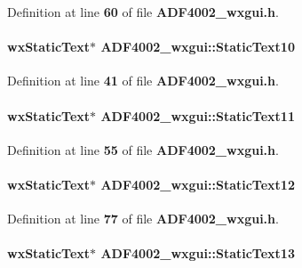 Definition at line {\bf 60} of file {\bf A\+D\+F4002\+\_\+wxgui.\+h}.

\paragraph[{Static\+Text10}]{\setlength{\rightskip}{0pt plus 5cm}wx\+Static\+Text$\ast$ A\+D\+F4002\+\_\+wxgui\+::\+Static\+Text10}\label{classADF4002__wxgui_a348617f7dad87cd244105639b76d079e}


Definition at line {\bf 41} of file {\bf A\+D\+F4002\+\_\+wxgui.\+h}.

\paragraph[{Static\+Text11}]{\setlength{\rightskip}{0pt plus 5cm}wx\+Static\+Text$\ast$ A\+D\+F4002\+\_\+wxgui\+::\+Static\+Text11}\label{classADF4002__wxgui_a2027fef7ab532631216e2fc985789f92}


Definition at line {\bf 55} of file {\bf A\+D\+F4002\+\_\+wxgui.\+h}.

\paragraph[{Static\+Text12}]{\setlength{\rightskip}{0pt plus 5cm}wx\+Static\+Text$\ast$ A\+D\+F4002\+\_\+wxgui\+::\+Static\+Text12}\label{classADF4002__wxgui_a1df8a8abc85848b7a089bc49241f3f48}


Definition at line {\bf 77} of file {\bf A\+D\+F4002\+\_\+wxgui.\+h}.

\paragraph[{Static\+Text13}]{\setlength{\rightskip}{0pt plus 5cm}wx\+Static\+Text$\ast$ A\+D\+F4002\+\_\+wxgui\+::\+Static\+Text13}\label{classADF4002__wxgui_ab91d86fa6f5b1041ffaf265455bceb3f}


